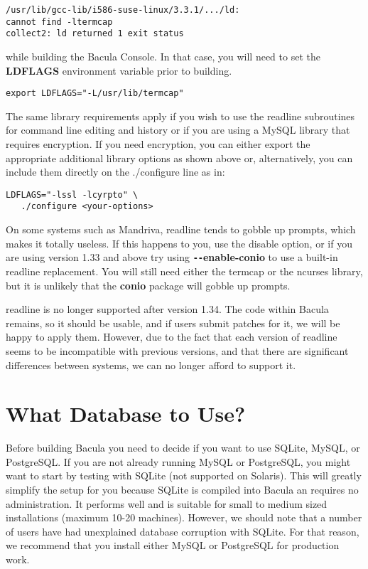 \footnotesize
\begin{verbatim}
/usr/lib/gcc-lib/i586-suse-linux/3.3.1/.../ld:
cannot find -ltermcap
collect2: ld returned 1 exit status
\end{verbatim}
\normalsize

while building the Bacula Console. In that case, you will need to set the {\bf
LDFLAGS} environment variable prior to building. 

\footnotesize
\begin{verbatim}
export LDFLAGS="-L/usr/lib/termcap"
\end{verbatim}
\normalsize

The same library requirements apply if you wish to use the readline
subroutines for command line editing and history or
if you are using a MySQL library that requires encryption. If you need encryption,
you can either export the appropriate additional library options as shown
above or, alternatively, you can include them directly on the ./configure line
as in: 

\footnotesize
\begin{verbatim}
LDFLAGS="-lssl -lcyrpto" \
   ./configure <your-options>
\end{verbatim}
\normalsize

On some systems such as Mandriva, readline tends to
gobble up prompts, which makes it totally useless. If this happens to you, use
the disable option, or if you are using version 1.33 and above try using {\bf
\verb:--:enable-conio} to use a built-in readline replacement. You will still need
either the termcap or the ncurses library, but it is unlikely that the {\bf conio}
package will gobble up prompts. 

readline is no longer supported after version 1.34.  The code within Bacula
remains, so it should be usable, and if users submit patches for it, we will
be happy to apply them.  However, due to the fact that each version of
readline seems to be incompatible with previous versions, and that there
are significant differences between systems, we can no longer afford to
support it.

\section{What Database to Use?}
\label{DB}

Before building Bacula you need to decide if you want to use SQLite, MySQL, or
PostgreSQL. If you are not already running MySQL or PostgreSQL, you might
want to start by testing with SQLite (not supported on Solaris).
This will greatly simplify the setup for you
because SQLite is compiled into Bacula an requires no administration. It
performs well and is suitable for small to medium sized installations (maximum
10-20 machines). However, we should note that a number of users have
had unexplained database corruption with SQLite. For that reason, we
recommend that you install either MySQL or PostgreSQL for production
work.

